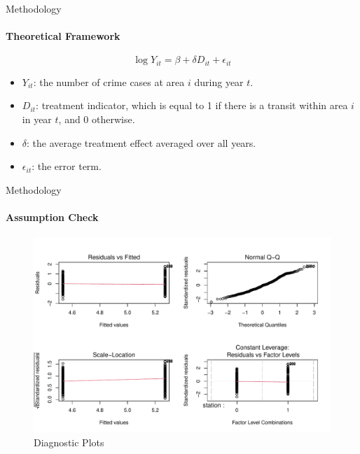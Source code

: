 \documentclass{beamer}
\begin{document}
\begin{frame}{Methodology}
\framesubtitle{Theoretical Framework}

\[\log Y_{it}=\beta + \delta D_{it} + \epsilon_{it} \]

\begin{itemize}
    \item $Y_{it}$: the number of crime cases at area $i$ during year $t$.
    \item $D_{it}$: treatment indicator, which is equal to 1 if there is a transit within area $i$ in year $t$, and 0 otherwise.
    \item $\delta$: the average treatment effect averaged over all years.
    \item $\epsilon_{it}$: the error term.
\end{itemize}


\end{frame}


\begin{frame}{Methodology}
\framesubtitle{Assumption Check}


\begin{figure}
    \centering
    \includegraphics[scale=0.5]{figures/logplot.pdf}
    \caption{Diagnostic Plots}
    \label{fig:diagnostic}
\end{figure}


\end{frame}




\end{document}
